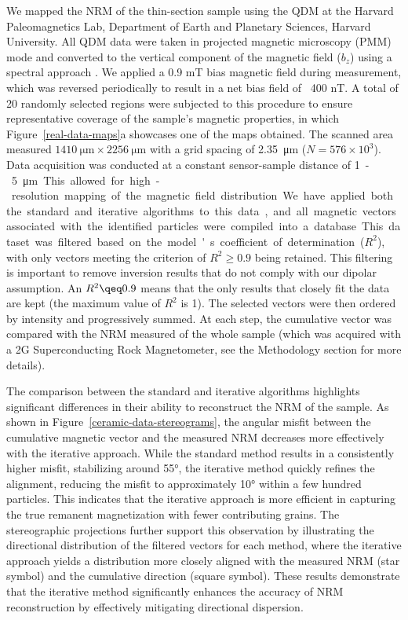 We mapped the NRM of the thin-section sample using the QDM at the Harvard Paleomagnetics Lab, Department of Earth and Planetary Sciences, Harvard University. All QDM data were taken in projected magnetic microscopy (PMM) mode and converted to the vertical component of the magnetic field ($b_z$) using a spectral approach \citep{Fu2020, Glenn2017, Lima2009}. We applied a 0.9 mT bias magnetic field during measurement, which was reversed periodically to result in a net bias field of ~400 nT. A total of 20 randomly selected regions were subjected to this procedure to ensure representative coverage of the sample's magnetic properties, in which Figure~\ref{real-data-maps}a showcases one of the maps obtained. The scanned area measured $\qty{1410}{\um} \times \qty{2256}{\um}$ with a grid spacing of \qty{2.35}{\um} ($N = 576 \times 10^{3}$). Data acquisition was conducted at a constant sensor-sample distance of \qty{1} - \qty{5}{\um}. This allowed for high-resolution mapping of the magnetic field distribution.

We have applied both the standard and iterative algorithms to this data, and all magnetic vectors associated with the identified particles were compiled into a database. This dataset was filtered based on the model's coefficient of determination ($R^2$), with only vectors meeting the criterion of $R^2 \geq 0.9$ being retained. This filtering is important to remove inversion results that do not comply with our dipolar assumption. An $R^2 \qeq 0.9$ means that the only results that closely fit the data are kept (the maximum value of $R^2$ is 1).  The selected vectors were then ordered by intensity and progressively summed. At each step, the cumulative vector was compared with the NRM measured of the whole sample (which was acquired with a 2G Superconducting Rock Magnetometer, see the Methodology section for more details).

The comparison between the standard and iterative algorithms highlights significant differences in their ability to reconstruct the NRM of the sample. As shown in Figure~\ref{ceramic-data-stereograms}, the angular misfit between the cumulative magnetic vector and the measured NRM decreases more effectively with the iterative approach. While the standard method results in a consistently higher misfit, stabilizing around \ang{55}, the iterative method quickly refines the alignment, reducing the misfit to approximately \ang{10} within a few hundred particles. This indicates that the iterative approach is more efficient in capturing the true remanent magnetization with fewer contributing grains. The stereographic projections further support this observation by illustrating the directional distribution of the filtered vectors for each method, where the iterative approach yields a distribution more closely aligned with the measured NRM (star symbol) and the cumulative direction (square symbol). These results demonstrate that the iterative method significantly enhances the accuracy of NRM reconstruction by effectively mitigating directional dispersion.

